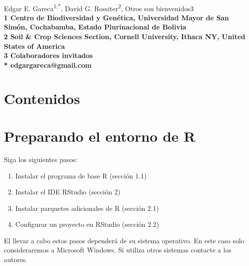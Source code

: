 \documentclass{article}
\begin{document}
\vspace*{0.35in}

\begin{flushleft}
{\Large
\textbf{}
}
\newline
\\
Edgar E. Gareca\textsuperscript{1,*},
David G. Rossiter\textsuperscript{2},
Otros son bienvenidos{3}
\\
\bigskip
\bf{1} Centro de Biodiversidad y Genética, Universidad Mayor de San Simón, Cochabamba, Estado Plurinacional de Bolivia
\\
\bf{2} Soil \& Crop Sciences Section, Cornell University, Ithaca NY, United States of America
\\
\bf{3} Colaboradores invitados
\\
\bigskip
* edgargareca@gmail.com

\end{flushleft}

\linenumbers

\section*{Contenidos}
	\tableofcontents

\section{Preparando el entorno de R}
Siga los siguientes pasos:
\begin{enumerate}
\item Instalar el programa de base R (sección 1.1)
\item Instalar el IDE RStudio (sección 2)
\item Instalar parquetes adicionales de R (sección 2.1)
\item Configurar un proyecto en RStudio (sección 2.2)
\end{enumerate}
El llevar a cabo estos pasos dependerá de su sistema operativo. En este caso solo consideraremos a Microsoft Windows. Si utiliza otros sistemas contacte a los autores.
\end{document}
